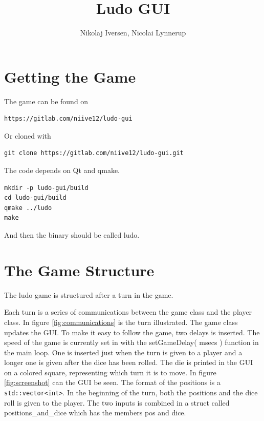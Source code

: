 \documentclass[a4paper,10pt]{article}
\title{Ludo GUI}
\author{Nikolaj Iversen, Nicolai Lynnerup}
\begin{document}
\maketitle

\section{Getting the Game}
The game can be found on
\begin{verbatim}
https://gitlab.com/niive12/ludo-gui
\end{verbatim}
Or cloned with
\begin{verbatim}
git clone https://gitlab.com/niive12/ludo-gui.git
\end{verbatim}
The code depends on Qt and qmake.
\begin{verbatim}
mkdir -p ludo-gui/build
cd ludo-gui/build
qmake ../ludo
make
\end{verbatim}
And then the binary should be called ludo.

\section{The Game Structure}
The ludo game is structured after a turn in the game.

Each turn is a series of communications between the game class and the player class.
In figure \ref{fig:communications} is the turn illustrated.
The game class updates the GUI.
To make it easy to follow the game, two delays is inserted.
The speed of the game is currently set in with the setGameDelay( msecs ) function in the main loop.
One is inserted just when the turn is given to a player and a longer one is given after the dice has been rolled.
The die is printed in the GUI on a colored square, representing which turn it is to move.
In figure \ref{fig:screenshot} can the GUI be seen.
The format of the positions is a \verb+std::vector<int>+.
In the beginning of the turn, both the positions and the dice roll is given to the player.
The two inputs is combined in a struct called positions\_and\_dice which has the members pos and dice.
\end{document}
